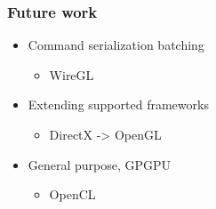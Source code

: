 \begin{frame}

\frametitle{Future work}

\begin{itemize}
  \item Command serialization batching \begin{itemize}\item WireGL\end{itemize}
  \item Extending supported frameworks \begin{itemize}\item DirectX -> OpenGL\end{itemize}
  \item General purpose, GPGPU \begin{itemize}\item OpenCL\end{itemize}
\end{itemize}

\end{frame}
